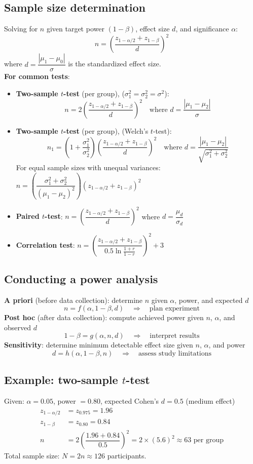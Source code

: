 \subsection{Sample size determination}
Solving for $n$ given target power $(1-\beta)$, effect size $d$, and significance $\alpha$:
$$n = \left(\dfrac{z_{1-\alpha/2} + z_{1-\beta}}{d}\right)^2$$
where $d = \dfrac{|\mu_1 - \mu_0|}{\sigma}$ is the standardized effect size.\\[0.5em]
\textbf{For common tests}:
\begin{itemize}
    \item \textbf{Two-sample $t$-test} (per group),  ($\sigma_1^2 = \sigma_2^2 = \sigma^2$):
        $$n = 2\left(\dfrac{z_{1-\alpha/2} + z_{1-\beta}}{d}\right)^2 \quad \text{where } d = \dfrac{|\mu_1 - \mu_2|}{\sigma}$$
    \item \textbf{Two-sample $t$-test} (per group),  (Welch's $t$-test):
        $$n_1 = \left(1 + \dfrac{\sigma_1^2}{\sigma_2^2}\right)\left(\dfrac{z_{1-\alpha/2} + z_{1-\beta}}{d}\right)^2
        \quad \text{where } d = \dfrac{|\mu_1 - \mu_2|}{\sqrt{\sigma_1^2 + \sigma_2^2}}$$
        For equal sample sizes with unequal variances: $n = \left(\dfrac{\sigma_1^2 + \sigma_2^2}{(\mu_1 - \mu_2)^2}\right)(z_{1-\alpha/2} + z_{1-\beta})^2$
    \item \textbf{Paired $t$-test}: $n = \left(\dfrac{z_{1-\alpha/2} + z_{1-\beta}}{d}\right)^2$ where $d = \dfrac{\mu_d}{\sigma_d}$
    \item \textbf{Correlation test}: $n = \left(\dfrac{z_{1-\alpha/2} + z_{1-\beta}}{0.5\ln\frac{1+r}{1-r}}\right)^2 + 3$
\end{itemize}

\subsection{Conducting a power analysis}
\textbf{A priori} (before data collection): determine $n$ given $\alpha$, power, and expected $d$
$$n = f(\alpha, 1-\beta, d) \quad \Rightarrow \quad \text{plan experiment}$$
\textbf{Post hoc} (after data collection): compute achieved power given $n$, $\alpha$, and observed $d$
$$1-\beta = g(\alpha, n, d) \quad \Rightarrow \quad \text{interpret results}$$
\textbf{Sensitivity}: determine minimum detectable effect size given $n$, $\alpha$, and power
$$d = h(\alpha, 1-\beta, n) \quad \Rightarrow \quad \text{assess study limitations}$$

\subsection{Example: two-sample $t$-test}
Given: $\alpha = 0.05$, power $= 0.80$, expected Cohen's $d = 0.5$ (medium effect)
\begin{align*}
z_{1-\alpha/2} &= z_{0.975} = 1.96 \\
z_{1-\beta} &= z_{0.80} = 0.84 \\
n &= 2\left(\dfrac{1.96 + 0.84}{0.5}\right)^2 = 2 \times (5.6)^2 \approx 63 \text{ per group}
\end{align*}
Total sample size: $N = 2n \approx 126$ participants.
